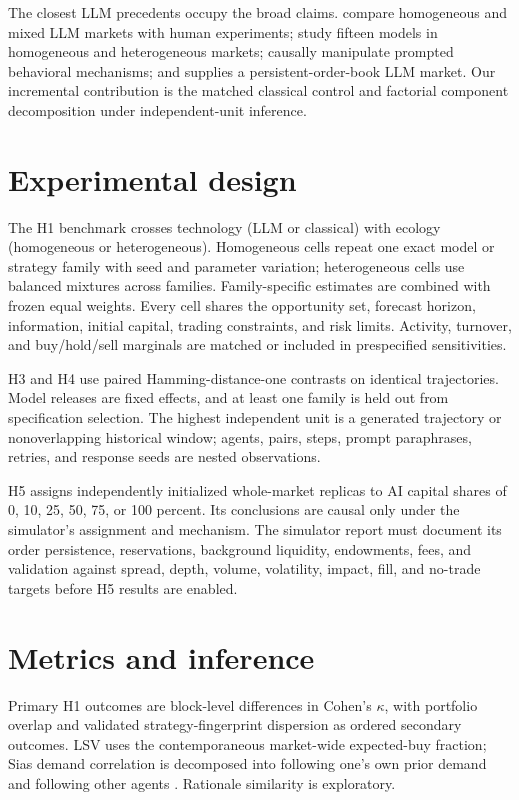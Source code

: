 \documentclass[11pt]{article}
\begin{document}
The closest LLM precedents occupy the broad claims. \citet{henning2025llm}
compare homogeneous and mixed LLM markets with human experiments;
\citet{saxena2026machine} study fifteen models in homogeneous and heterogeneous
markets; \citet{ouyang2026dissecting} causally manipulate prompted behavioral
mechanisms; and \citet{lopezlira2025trade} supplies a persistent-order-book LLM
market. Our incremental contribution is the matched classical control and
factorial component decomposition under independent-unit inference.

\section{Experimental design}
The H1 benchmark crosses technology (LLM or classical) with ecology
(homogeneous or heterogeneous). Homogeneous cells repeat one exact model or
strategy family with seed and parameter variation; heterogeneous cells use
balanced mixtures across families. Family-specific estimates are combined with
frozen equal weights. Every cell shares the opportunity set, forecast horizon,
information, initial capital, trading constraints, and risk limits. Activity,
turnover, and buy/hold/sell marginals are matched or included in prespecified
sensitivities.

H3 and H4 use paired Hamming-distance-one contrasts on identical trajectories.
Model releases are fixed effects, and at least one family is held out from
specification selection. The highest independent unit is a generated trajectory
or nonoverlapping historical window; agents, pairs, steps, prompt paraphrases,
retries, and response seeds are nested observations.

H5 assigns independently initialized whole-market replicas to AI capital shares
of 0, 10, 25, 50, 75, or 100 percent. Its conclusions are causal only under the
simulator's assignment and mechanism. The simulator report must document its
order persistence, reservations, background liquidity, endowments, fees, and
validation against spread, depth, volume, volatility, impact, fill, and no-trade
targets before H5 results are enabled.

\section{Metrics and inference}
Primary H1 outcomes are block-level differences in Cohen's $\kappa$, with
portfolio overlap and validated strategy-fingerprint dispersion as ordered
secondary outcomes. LSV uses the contemporaneous market-wide expected-buy
fraction; Sias demand correlation is decomposed into following one's own prior
demand and following other agents \citep{lakonishok1992impact,sias2004institutional}.
Rationale similarity is exploratory.
\end{document}
